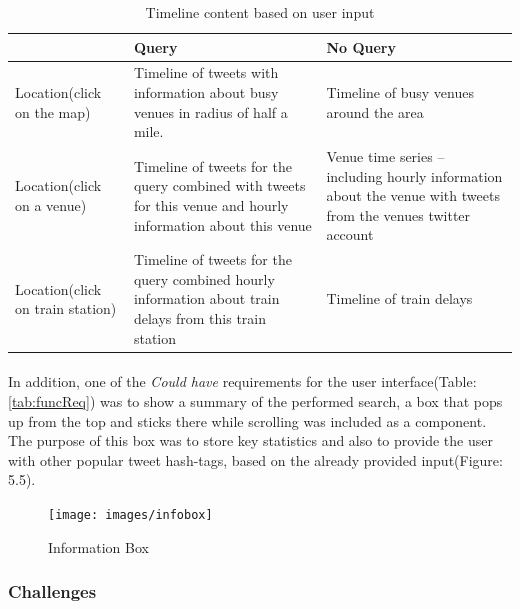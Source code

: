 \documentclass{l4proj}
\begin{document}
\begin{table}[H]
	\centering
	\begin{tabular}{|p{2cm}|p{7cm}|p{7cm}|} \hline
		&	Query	& No Query \\ \hline
		Location(click on the map) 	& Timeline of tweets with information about busy venues	in radius of half a mile.	& Timeline of busy venues around the area  \\ \hline
		Location(click on a venue)	& Timeline of tweets for the query combined with tweets for this venue and hourly information about this venue	& Venue time series – including	hourly information about the venue with tweets from the venue\textquotesingle s twitter account  \\ \hline
		Location(click on train station)	& Timeline of tweets for the query combined hourly information about train delays from this train station & 	Timeline of train delays \\ \hline
	\end{tabular}
	\caption{Timeline content based on user input}
	\label{tab:contentuserinput}
\end{table}


\paragraph{}
In addition, one of the \textit{Could have} requirements for the user interface(Table: \ref{tab:funcReq}) was to show a summary of the performed search, a box that pops up from the top and sticks there while scrolling was included as a component. The purpose of this box was to store key statistics and also to provide the user with other popular tweet hash-tags, based on the already provided input(Figure: 5.5).  

\begin{figure}[H]
	\centering
	\texttt{[image: images/infobox]}
	\label{zebrainfobox}
	\caption{Information Box}
\end{figure}

\subsubsection{Challenges}
\end{document}
